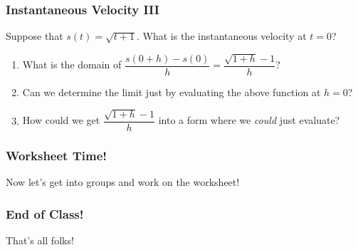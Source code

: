 \documentclass{ltx-talk}
\begin{document}
\begin{frame}
  \frametitle{Instantaneous Velocity III}
    
  Suppose that $s(t) = \sqrt{t + 1}$. What is the instantaneous velocity at $t = 0$? \pause

  \begin{enumerate}
    \item What is the domain of $\dfrac{s(0 + h) - s(0)}{h} = \dfrac{\sqrt{1 + h} - 1}{h}$? \pause
    \item Can we determine the limit just by evaluating the above function at $h = 0$? \pause
    \item How could we get $\dfrac{\sqrt{1 + h} - 1}{h}$ into a form where we \textit{could} just evaluate?
  \end{enumerate}
\end{frame}

\begin{frame}
  \frametitle{Worksheet Time!}

  Now let's get into groups and work on the worksheet!
\end{frame}

\begin{frame}
  \frametitle{End of Class!}

  That's all folks!
\end{frame}
\end{document}
